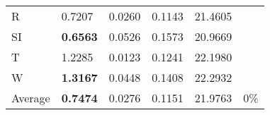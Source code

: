 \documentclass[11pt, a4paper]{article}
\begin{document}
\begin{table}[H]
\begin{tabular}{llllll}
R                                & 0.7207                            & 0.0260                            & 0.1143                               & 21.4605                                     &                                   \\
SI                        & \textbf{0.6563}                   & 0.0526                            & 0.1573                               & 20.9669                                     &                                   \\
T                              & 1.2285                            & 0.0123                            & 0.1241                               & 22.1980                                     &                                   \\
W                             & \textbf{1.3167}                   & 0.0448                            & 0.1408                               & 22.2932                                     &                                   \\ \hline
Average                               & \textbf{0.7474}                   & 0.0276                            & 0.1151                               & 21.9763                                     & 0\%
\end{tabular}
\end{table}
\end{document}
